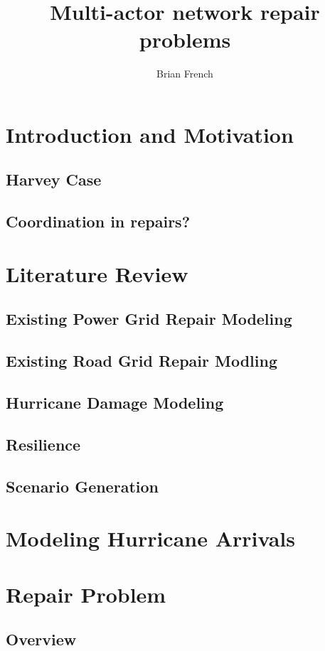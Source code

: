 \documentclass{article}
\begin{document}
	\title{Multi-actor network repair problems}
	\author{Brian French}
	\maketitle
	
	\section{Introduction and Motivation}
	\subsection{Harvey Case}
	\subsection{Coordination in repairs?}
	\section{Literature Review}
	\subsection{Existing Power Grid Repair Modeling}
	\subsection{Existing Road Grid Repair Modling}
	\subsection{Hurricane Damage Modeling}
	\subsection{Resilience}
	\subsection{Scenario Generation}
	\section{Modeling Hurricane Arrivals}
	\section{Repair Problem}
	\subsection{Overview}
\end{document}
